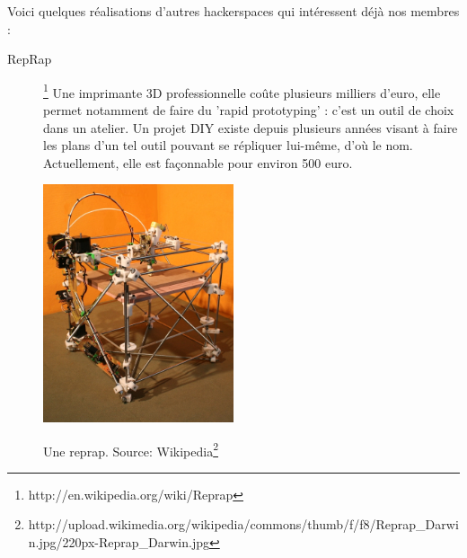 \documentclass{article}
\begin{document}
Voici quelques réalisations d'autres hackerspaces qui intéressent déjà nos membres :
\begin{description}
\item[RepRap]\footnote{http://en.wikipedia.org/wiki/Reprap} Une imprimante 3D professionnelle coûte plusieurs milliers d'euro, elle permet notamment de faire du 'rapid prototyping' : c'est un outil de choix dans un atelier. Un projet DIY existe depuis plusieurs années visant à faire les plans d'un tel outil pouvant se répliquer lui-même, d'où le nom. Actuellement, elle est façonnable pour environ 500 euro.

\begin{center}
\includegraphics[height=70mm]{reprap-darwin.jpg}

Une reprap. Source: Wikipedia\footnote{http://upload.wikimedia.org/wikipedia/commons/thumb/f/f8/Reprap\_Darwin.jpg/220px-Reprap\_Darwin.jpg}
\end{center}


\end{description}
\end{document}
